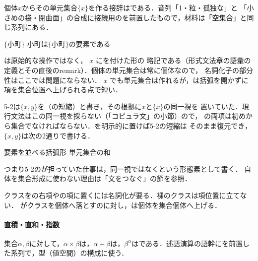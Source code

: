 \documentclass[../../main-detail.tex]{subfiles}
\begin{document}
個体$x$からその単元集合$\{x\}$を作る接辞はである．音列「1・粒・孤独な」と
「小さめの袋・閉曲面」の合成に接続用のを前置したもので，材料は「空集合」と同じ系列にある．
\begin{exe}
    \ex {}\hfill $\{$小町$\}$
    \ex {}\hfill 小町は$\{$小町$\}$の要素である
\end{exe}
は原始的な操作ではなく， $x$ にを付けた形の
略記である（形式文法章の語彙の定義とその直後のremark）．個体の単元集合は常に個体なので，
名詞化子の部分性はここでは問題にならない． $x$ でも単元集合は作れるが，は括弧を開かずに項を集合位置へ上げられる点で短い．

5-2は$\{x,y\}$を（の短縮）と書き，その根拠に$x$と$\{x\}$の同一視を
置いていた．現行文法はこの同一視を採らない（「コピュラ文」の小節）ので，
の両項は初めから集合でなければならない．を明示的に置けば5-2の短縮は
そのまま復元でき，$\{x,y\}$は次の2通りで書ける．
\begin{exe}
    \ex {}\hfill 要素を並べる括弧形
    \ex {}\hfill 単元集合の和
\end{exe}
つまり5-2のが担っていた仕事は，同一視ではなくという形態素として書く．
自体を集合形成に使わない理由は「文をつなぐ」の節を参照．

クラスをの右項やの項に置くには名詞化が要る．裸のクラスは項位置に立てない．
がクラスを個体へ落とすのに対し，は個体を集合個体へ上げる．

\paragraph{直積・直和・指数}
集合$\alpha,\beta$に対して，$\alpha\times\beta$は，$\alpha+\beta$は，$\beta^\alpha$はである．述語演算の語幹にを前置した系列で，型（値空間）の構成に使う．
\end{document}
